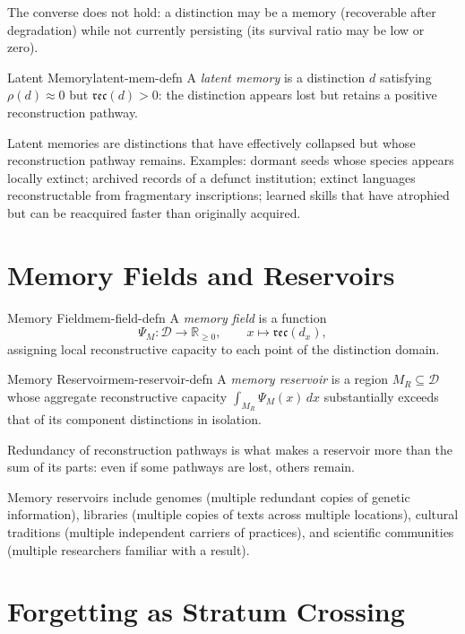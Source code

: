 \documentclass[12pt,twoside,openright]{book}
\newcommand{\reco}{\mathfrak{rec}}        %
\newcommand{\survRatio}{\rho}             %
\providecommand{\memField}{\Psi_{M}}
\begin{document}
The converse does not hold: a distinction may be a memory
(recoverable after degradation) while not currently persisting
(its survival ratio may be low or zero).

\begin{definition}{Latent Memory}{latent-mem-defn}
A \emph{latent memory} is a distinction $d$ satisfying
$\survRatio(d)\approx 0$ but $\reco(d)>0$: the distinction
appears lost but retains a positive reconstruction pathway.
\end{definition}

Latent memories are distinctions that have effectively collapsed
but whose reconstruction pathway remains. Examples: dormant
seeds whose species appears locally extinct; archived records
of a defunct institution; extinct languages reconstructable
from fragmentary inscriptions; learned skills that have atrophied
but can be reacquired faster than originally acquired.

\section{Memory Fields and Reservoirs}

\begin{definition}{Memory Field}{mem-field-defn}
A \emph{memory field} is a function
\[
  \memField:\mathcal{D}\longrightarrow\mathbb{R}_{\ge0},
  \qquad
  x\longmapsto\reco(d_x),
\]
assigning local reconstructive capacity to each point of the
distinction domain.
\end{definition}

\begin{definition}{Memory Reservoir}{mem-reservoir-defn}
A \emph{memory reservoir} is a region $M_R\subseteq\mathcal{D}$
whose aggregate reconstructive capacity
$\int_{M_R}\memField(x)\,dx$ substantially exceeds that of
its component distinctions in isolation.

Redundancy of reconstruction pathways is what makes a reservoir
more than the sum of its parts: even if some pathways are lost,
others remain.
\end{definition}

Memory reservoirs include genomes (multiple redundant copies
of genetic information), libraries (multiple copies of texts
across multiple locations), cultural traditions (multiple
independent carriers of practices), and scientific communities
(multiple researchers familiar with a result).

\section{Forgetting as Stratum Crossing}
\end{document}
